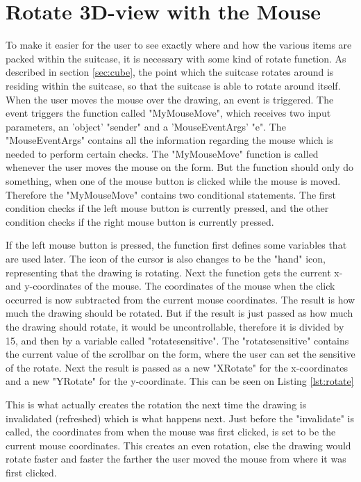 \section{Rotate 3D-view with the Mouse}

To make it easier for the user to see exactly where and how the various items are packed within the suitcase, it is necessary with some kind of rotate function. As described in section \ref{sec:cube}, the point which the suitcase rotates around is residing within the suitcase, so that the suitcase is able to rotate around itself. When the user moves the mouse over the drawing, an event is triggered. The event triggers the function called "MyMouseMove", which receives two input parameters, an 'object' "sender" and a 'MouseEventArgs' "e". The "MouseEventArgs" contains all the information regarding the mouse which is needed to perform certain checks. The "MyMouseMove" function is called whenever the user moves the mouse on the form. But the function should only do something, when one of the mouse button is clicked while the mouse is moved. Therefore the "MyMouseMove" contains two conditional statements. The first condition checks if the left mouse button is currently pressed, and the other condition checks if the right mouse button is currently pressed.

If the left mouse button is pressed, the function first defines some variables that are used later. The icon of the cursor is also changes to be the "hand" icon, representing that the drawing is rotating. Next the function gets the current x- and y-coordinates of the mouse. The coordinates of the mouse when the click occurred is now subtracted from the current mouse coordinates. The result is how much the drawing should be rotated. But if the result is just passed as how much the drawing should rotate, it would be uncontrollable, therefore it is divided by 15, and then by a variable called "rotatesensitive". The "rotatesensitive" contains the current value of the scrollbar on the form, where the user can set the sensitive of the rotate. Next the result is passed as a new "XRotate" for the x-coordinates and a new "YRotate" for the y-coordinate. This can be seen on Listing \ref{lst:rotate}


This is what actually creates the rotation the next time the drawing is invalidated (refreshed) which is what happens next. Just before the "invalidate" is called, the coordinates from when the mouse was first clicked, is set to be the current mouse coordinates. This creates an even rotation, else the drawing would rotate faster and faster the farther the user moved the mouse from where it was first clicked. 